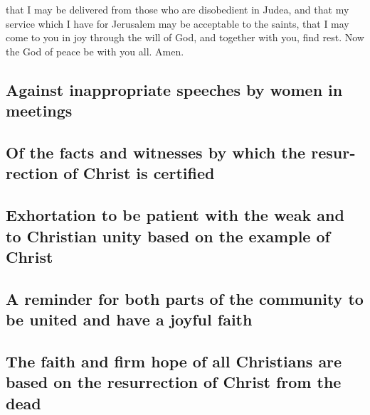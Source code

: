 \begin{paracol}{2}
\begin{otherlanguage}{english}
 that I may be delivered from those who are disobedient
in Judea, and that my service which I have for Jerusalem may be
acceptable to the saints,  that I may come to you in joy
through the will of God, and together with you, find rest.
 Now the God of peace be with you all. Amen.

\hypertarget{against-inappropriate-speeches-by-women-in-meetings}{%
\subsection{Against inappropriate speeches by women in
meetings}\label{against-inappropriate-speeches-by-women-in-meetings}}

\hypertarget{of-the-facts-and-witnesses-by-which-the-resurrection-of-christ-is-certified}{%
\subsection{Of the facts and witnesses by which the resurrection of
Christ is
certified}\label{of-the-facts-and-witnesses-by-which-the-resurrection-of-christ-is-certified}}

\hypertarget{exhortation-to-be-patient-with-the-weak-and-to-christian-unity-based-on-the-example-of-christ}{%
\subsection{Exhortation to be patient with the weak and to Christian
unity based on the example of
Christ}\label{exhortation-to-be-patient-with-the-weak-and-to-christian-unity-based-on-the-example-of-christ}}

\hypertarget{a-reminder-for-both-parts-of-the-community-to-be-united-and-have-a-joyful-faith}{%
\subsection{A reminder for both parts of the community to be united and
have a joyful
faith}\label{a-reminder-for-both-parts-of-the-community-to-be-united-and-have-a-joyful-faith}}

\hypertarget{the-faith-and-firm-hope-of-all-christians-are-based-on-the-resurrection-of-christ-from-the-dead}{%
\subsection{The faith and firm hope of all Christians are based on the
resurrection of Christ from the
dead}\label{the-faith-and-firm-hope-of-all-christians-are-based-on-the-resurrection-of-christ-from-the-dead}}


\end{otherlanguage}
\end{paracol}
